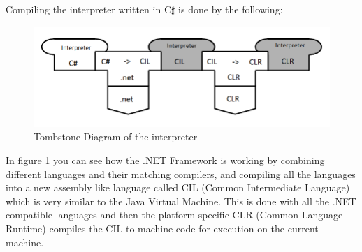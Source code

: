 Compiling the interpreter written in C$\sharp$ is done by the following:

			\begin{figure}[H]
				\centering
				\includegraphics[scale=0.75]{rapport/3/figures/tombstone_of_the_interpreter}
				\caption{Tombstone Diagram of the interpreter} \label{fig:tombstone_of_interpreter}
			\end{figure}

In figure \ref{fig:tombstone_of_interpreter} you can see how the .NET Framework is working by combining different languages and their matching compilers, and compiling all the languages into a new assembly like language called CIL (Common Intermediate Language) \cite{CIL} which is very similar to the Java Virtual Machine. This is done with all the .NET compatible languages and then the platform specific CLR (Common Language Runtime) compiles the CIL to machine code for execution on the current machine.

			
			